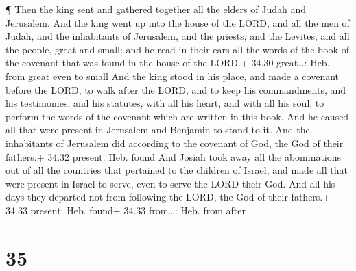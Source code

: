  ¶ Then the king sent and gathered together all the elders
of Judah and Jerusalem.  And the king went up into the
house of the LORD, and all the men of Judah, and the inhabitants of
Jerusalem, and the priests, and the Levites, and all the people, great
and small: and he read in their ears all the words of the book of the
covenant that was found in the house of the LORD.+ 34.30 great\ldots:
Heb. from great even to small  And the king stood in his
place, and made a covenant before the LORD, to walk after the LORD, and
to keep his commandments, and his testimonies, and his statutes, with
all his heart, and with all his soul, to perform the words of the
covenant which are written in this book.  And he caused all
that were present in Jerusalem and Benjamin to stand to it. And the
inhabitants of Jerusalem did according to the covenant of God, the God
of their fathers.+ 34.32 present: Heb. found  And Josiah
took away all the abominations out of all the countries that pertained
to the children of Israel, and made all that were present in Israel to
serve, even to serve the LORD their God. And all his days they departed
not from following the LORD, the God of their fathers.+ 34.33 present:
Heb. found+ 34.33 from\ldots: Heb. from after

\hypertarget{section-34}{%
\section{35}\label{section-34}}

